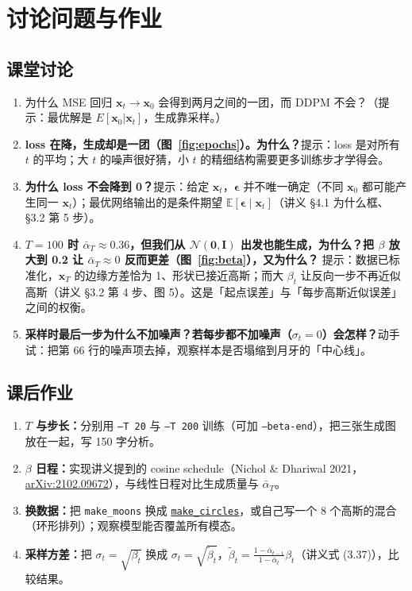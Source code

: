 \documentclass[a4paper,fontset=none,zihao=5]{ctexart}
\newcommand{\x}{\mathbf{x}}
\newcommand{\I}{\mathbf{I}}
\newcommand{\N}{\mathcal{N}}
\newcommand{\abar}{\bar{\alpha}}
\newcommand{\eps}{\boldsymbol{\epsilon}}
\newcommand{\E}{\mathbb{E}}
\newcommand{\code}[1]{\texttt{#1}}
\begin{document}
\section{讨论问题与作业}
\subsection{课堂讨论}
\begin{enumerate}[leftmargin=2em,itemsep=2pt]
  \item 为什么 MSE 回归 $\x_t\to\x_0$ 会得到两月之间的一团，而 DDPM 不会？（提示：最优解是 $E[\x_0|\x_t]$，生成靠采样。）
  \item \textbf{loss 在降，生成却是一团（图~\ref{fig:epochs}）。为什么？}提示：loss 是对所有 $t$ 的平均；大 $t$ 的噪声很好猜，小 $t$ 的精细结构需要更多训练步才学得会。
  \item \textbf{为什么 loss 不会降到 0？}提示：给定 $\x_t$，$\eps$ 并不唯一确定（不同 $\x_0$ 都可能产生同一 $\x_t$）；最优网络输出的是条件期望 $\E[\eps\mid\x_t]$（讲义 §4.1 为什么框、§3.2 第 5 步）。
  \item \textbf{$T=100$ 时 $\abar_T\approx0.36$，但我们从 $\N(\mathbf 0,\I)$ 出发也能生成，为什么？把 $\beta$ 放大到 0.2 让 $\abar_T\approx0$ 反而更差（图~\ref{fig:beta}），又为什么？}
        提示：数据已标准化，$\x_T$ 的边缘方差恰为 1、形状已接近高斯；而大 $\beta_t$ 让反向一步不再近似高斯（讲义 §3.2 第 4 步、图 5）。这是「起点误差」与「每步高斯近似误差」之间的权衡。
  \item \textbf{采样时最后一步为什么不加噪声？若每步都不加噪声（$\sigma_t=0$）会怎样？}动手试：把第 66 行的噪声项去掉，观察样本是否塌缩到月牙的「中心线」。
\end{enumerate}

\subsection{课后作业}
\begin{enumerate}[leftmargin=2em,itemsep=2pt]
  \item \textbf{$T$ 与步长：}分别用 \code{--T 20} 与 \code{--T 200} 训练（可加 \code{--beta-end}），把三张生成图放在一起，写 150 字分析。
  \item \textbf{$\beta$ 日程：}实现讲义提到的 cosine schedule（Nichol \& Dhariwal 2021，\href{https://arxiv.org/abs/2102.09672}{arXiv:2102.09672}），与线性日程对比生成质量与 $\abar_T$。
  \item \textbf{换数据：}把 \code{make\_moons} 换成 \href{https://scikit-learn.org/stable/modules/generated/sklearn.datasets.make_circles.html}{\code{make\_circles}}，或自己写一个 8 个高斯的混合（环形排列）；观察模型能否覆盖所有模态。
  \item \textbf{采样方差：}把 $\sigma_t=\sqrt{\beta_t}$ 换成 $\sigma_t=\sqrt{\tilde\beta_t}$，$\tilde\beta_t=\frac{1-\abar_{t-1}}{1-\abar_t}\beta_t$（讲义式 (3.37)），比较结果。
\end{enumerate}
\end{document}
